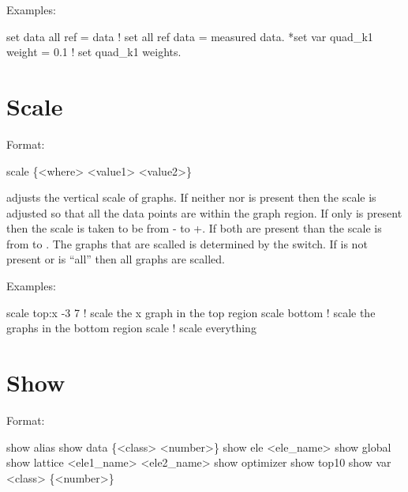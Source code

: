 Examples:
\begin{example}
  set data all ref = data       ! set all ref data = measured data.
  *set var quad_k1 weight = 0.1 ! set quad_k1 weights. 
\end{example}

\section{Scale}
\label{s:scale}

Format:
\begin{example}
  scale \{<where> <value1> <value2>\}
\end{example}

\vskip 0.2in  adjusts the vertical scale of graphs. If
neither  nor  is present then the scale is
adjusted so that all the data points are within the graph region.  If
only  is present then the scale is taken to be from
- to +. If both are present than the scale
is from  to .  The graphs that are scalled
is determined by the  switch. If  is not
present  or  is ``all'' then all graphs are scalled. 

Examples:
\begin{example}
  scale top:x -3  7  ! scale the x graph in the top region
  scale bottom       ! scale the graphs in the bottom region
  scale              ! scale everything
\end{example}


\section{Show}
\label{s:show}

Format:
\begin{example}
  show alias                     
  show data \{<class> <number>\} 
  show ele <ele_name>
  show global
  show lattice <ele1_name> <ele2_name>
  show optimizer
  show top10
  show var <class> \{<number>\}
\end{example}

